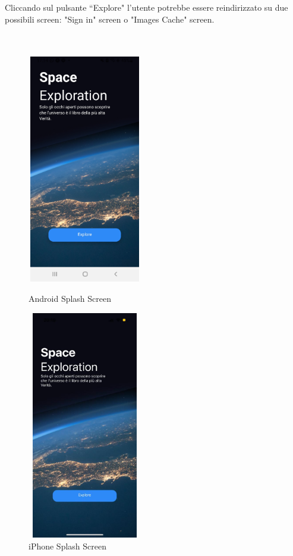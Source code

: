 Cliccando sul pulsante ``Explore" l'utente potrebbe essere reindirizzato su due possibili screen: "Sign in" screen o "Images Cache" screen.\\ \\ \\
\begin{figure}[h]
    \begin{minipage}[h]{0.47\textwidth}
        \centering
        \includegraphics[width=5cm, height=10cm]{images/immaginiAndroid/splashScreen.jpg}
        \caption{\label{SpalshScreenAndroid} Android Splash Screen}
    \end{minipage}
    \hfill
    \begin{minipage}[h]{0.47\textwidth}
        \centering
        \includegraphics[width=5cm, height=10cm]{images/immaginiPhone/splashScreen.jpeg}
        \caption{\label{splashScreenIphone}iPhone Splash Screen}
    \end{minipage}
\end{figure}


